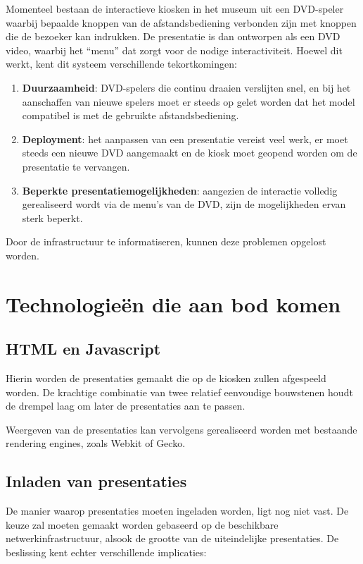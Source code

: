 \documentclass[a4paper,oneside,11pt,final]{memoir}
\begin{document}
Momenteel bestaan de interactieve kiosken in het museum uit een DVD-speler waarbij bepaalde knoppen van de afstandsbediening verbonden zijn met knoppen die de bezoeker kan indrukken. De presentatie is dan ontworpen als een DVD video, waarbij het ``menu'' dat zorgt voor de nodige interactiviteit. Hoewel dit werkt, kent dit systeem verschillende tekortkomingen:
\begin{enumerate}
\item \textbf{Duurzaamheid}: DVD-spelers die continu draaien verslijten snel, en bij het aanschaffen van nieuwe spelers moet er steeds op gelet worden dat het model compatibel is met de gebruikte afstandsbediening.
\item \textbf{Deployment}: het aanpassen van een presentatie vereist veel werk, er moet steeds een nieuwe DVD aangemaakt en de kiosk moet geopend worden om de presentatie te vervangen.
\item \textbf{Beperkte presentatiemogelijkheden}: aangezien de interactie volledig gerealiseerd wordt via de menu's van de DVD, zijn de mogelijkheden ervan sterk beperkt.
\end{enumerate}

Door de infrastructuur te informatiseren, kunnen deze problemen opgelost worden.


\section{Technologieën die aan bod komen}

\subsection{HTML en Javascript}

Hierin worden de presentaties gemaakt die op de kiosken zullen afgespeeld worden. De krachtige combinatie van twee relatief eenvoudige bouwstenen houdt de drempel laag om later de presentaties aan te passen.

Weergeven van de presentaties kan vervolgens gerealiseerd worden met bestaande rendering engines, zoals Webkit of Gecko.

\subsection{Inladen van presentaties}

De manier waarop presentaties moeten ingeladen worden, ligt nog niet vast. De keuze zal moeten gemaakt worden gebaseerd op de beschikbare netwerkinfrastructuur, alsook de grootte van de uiteindelijke presentaties. De beslissing kent echter verschillende implicaties:
\end{document}
